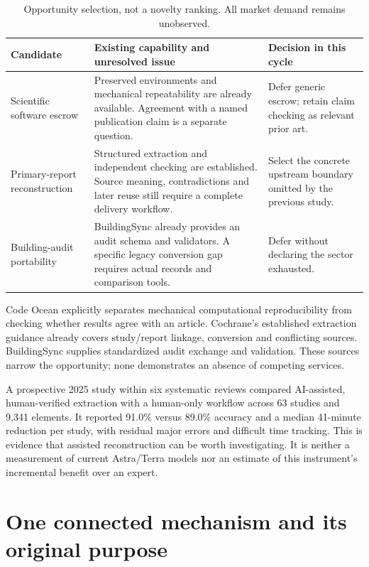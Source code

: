 \begin{table}[htbp]\centering\small
\begin{tabularx}{\textwidth}{p{}YY}
\toprule Candidate & Existing capability and unresolved issue & Decision in this cycle\\\midrule
Scientific software escrow & Preserved environments and mechanical repeatability are already available. Agreement with a named publication claim is a separate question. & Defer generic escrow; retain claim checking as relevant prior art.\\
Primary-report reconstruction & Structured extraction and independent checking are established. Source meaning, contradictions and later reuse still require a complete delivery workflow. & Select the concrete upstream boundary omitted by the previous study.\\
Building-audit portability & BuildingSync already provides an audit schema and validators. A specific legacy conversion gap requires actual records and comparison tools. & Defer without declaring the sector exhausted.\\\bottomrule
\end{tabularx}
\caption{Opportunity selection, not a novelty ranking. All market demand remains unobserved.}
\end{table}

Code Ocean explicitly separates mechanical computational reproducibility from checking whether results agree with an article. Cochrane's established extraction guidance already covers study/report linkage, conversion and conflicting sources. BuildingSync supplies standardized audit exchange and validation. These sources narrow the opportunity; none demonstrates an absence of competing services.\citep{codeocean,cochrane,buildingsync}

A prospective 2025 study within six systematic reviews compared AI-assisted, human-verified extraction with a human-only workflow across 63 studies and 9,341 elements. It reported 91.0\% versus 89.0\% accuracy and a median 41-minute reduction per study, with residual major errors and difficult time tracking. This is evidence that assisted reconstruction can be worth investigating. It is neither a measurement of current Astra/Terra models nor an estimate of this instrument's incremental benefit over an expert.\citep{gartlehner}

\section{One connected mechanism and its original purpose}

